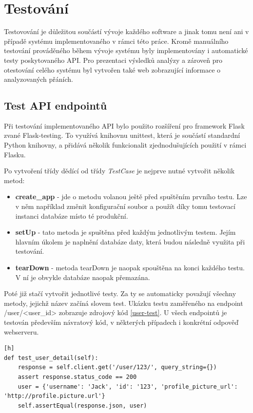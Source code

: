 \documentclass[thesis=B,czech]{FITthesis}[2012/06/26]
\begin{document}
\chapter{Testování}
\label{testovani}
Testovování je důležitou součástí vývoje každého software a jinak tomu není ani v případě systému implementovaného v rámci této práce. Kromě manuálního testování prováděného během vývoje systému byly implementovány i automatické testy poskytovaného API. Pro prezentaci výsledků analýzy a zároveň pro otestování celého systému byl vytvořen také web zobrazující informace o analyzovaných přáních. 


\section{Test API endpointů}
\label{api-testing}
Při testování implementovaného API bylo použito rozšíření pro framework Flask zvané Flask-testing. To využívá knihovnu unittest, která je součástí standardní Python knihovny, a přidává několik funkcionalit zjednodušujících použití v rámci Flasku. 

Po vytvoření třídy dědící od třídy \textit{TestCase} je nejprve nutné vytvořit několik metod:

\begin{itemize}
\item \textbf{create\_app} - jde o metodu volanou ještě před spuštěním prvního testu. Lze v něm například změnit konfigurační soubor a použít díky tomu testovací instanci databáze místo té produkční. 
\item \textbf{setUp} - tato metoda je spuštěna před každým jednotlivým testem. Jejím hlavním úkolem je naplnění databáze daty, která budou následně využita při testování. 
\item \textbf{tearDown} - metoda tearDown je naopak spouštěna na konci každého testu. V ní je obvykle databáze naopak přemazána. 
\end{itemize}

Poté již stačí vytvořit jednotlivé testy. Za ty se automaticky považují všechny metody, jejichž název začíná slovem test. Ukázku testu zaměřeného na endpoint /user/<user\_id> zobrazuje zdrojový kód \ref{user-test}. U všech endpointů je testován především návratový kód, v některých případech i konkrétní odpověď webserveru. 


\begin{lstlisting}[caption={Test endpointu /user/<user\_id>},label=user-test][h]
def test_user_detail(self):
	response = self.client.get('/user/123/', query_string={})
	assert response.status_code == 200
	user = {'username': 'Jack', 'id': '123', 'profile_picture_url': 'http://profile.picture.url'}
	self.assertEqual(response.json, user)
\end{lstlisting}
\end{document}

